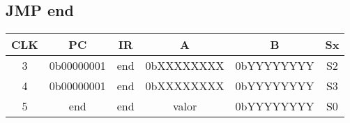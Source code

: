 \documentclass[../main.tex]{subfiles}
\begin{document}
\subsection{JMP end}

\begin{table}[H]
	\centering
	\begin{tabular}{|c|c|c|c|c|c|} %
	\hline
	CLK & PC & IR & A& B & Sx \\\hline
	3 & 0b00000001 & end & 0bXXXXXXXX & 0bYYYYYYYY & S2 \\\hline 
	4 & 0b00000001 & end & 0bXXXXXXXX & 0bYYYYYYYY & S3 \\\hline
	5 & end & end & valor & 0bYYYYYYYY & S0 \\\hline
	\end{tabular}
\end{table}
\end{document}
